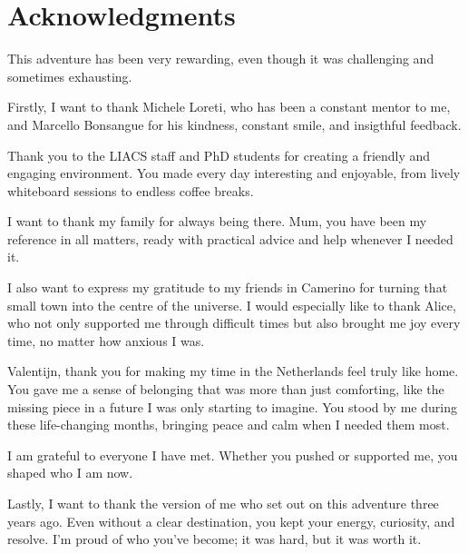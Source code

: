 \chapter*{Acknowledgments}
This adventure has been very rewarding, even though it was challenging and sometimes exhausting.

Firstly, I want to thank Michele Loreti, who has been a constant mentor to me, and Marcello Bonsangue for his kindness, constant smile, and insigthful feedback.

Thank you to the LIACS staff and PhD students for creating a friendly and engaging environment. You made every day interesting and enjoyable, from lively whiteboard sessions to endless coffee breaks.

I want to thank my family for always being there. Mum, you have been my reference in all matters, ready with practical advice and help whenever I needed it.

I also want to express my gratitude to my friends in Camerino for turning that small town into the centre of the universe. I would especially like to thank Alice, who not only supported me through difficult times but also brought me joy every time, no matter how anxious I was.

Valentijn, thank you for making my time in the Netherlands feel truly like home. You gave me a sense of belonging that was more than just comforting, like the missing piece in a future I was only starting to imagine. You stood by me during these life-changing months, bringing peace and calm when I needed them most.

I am grateful to everyone I have met. Whether you pushed or supported me, you shaped who I am now.

Lastly, I want to thank the version of me who set out on this adventure three years ago. Even without a clear destination, you kept your energy, curiosity, and resolve. I'm proud of who you've become; it was hard, but it was worth it.